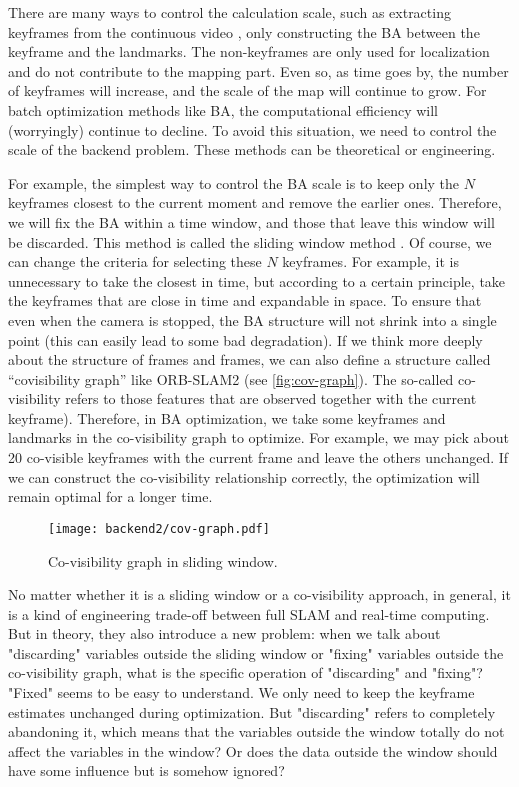There are many ways to control the calculation scale, such as extracting keyframes from the continuous video \cite{Leutenegger2015}, only constructing the BA between the keyframe and the landmarks. The non-keyframes are only used for localization and do not contribute to the mapping part. Even so, as time goes by, the number of keyframes will increase, and the scale of the map will continue to grow. For batch optimization methods like BA, the computational efficiency will (worryingly) continue to decline. To avoid this situation, we need to control the scale of the backend problem. These methods can be theoretical or engineering.

For example, the simplest way to control the BA scale is to keep only the $N$ keyframes closest to the current moment and remove the earlier ones. Therefore, we will fix the BA within a time window, and those that leave this window will be discarded. This method is called the sliding window method \cite{Sibley2008}. Of course, we can change the criteria for selecting these $N$ keyframes. For example, it is unnecessary to take the closest in time, but according to a certain principle, take the keyframes that are close in time and expandable in space. To ensure that even when the camera is stopped, the BA structure will not shrink into a single point (this can easily lead to some bad degradation). If we think more deeply about the structure of frames and frames, we can also define a structure called ``covisibility graph'' like ORB-SLAM2 \cite{Mur-Artal2015} (see \autoref{fig:cov-graph}). The so-called co-visibility refers to those features that are observed together with the current keyframe). Therefore, in BA optimization, we take some keyframes and landmarks in the co-visibility graph to optimize. For example, we may pick about 20 co-visible keyframes with the current frame and leave the others unchanged. If we can construct the co-visibility relationship correctly, the optimization will remain optimal for a longer time.

\begin{figure}[!ht]
	\centering
	\texttt{[image: backend2/cov-graph.pdf]}
	\caption{Co-visibility graph in sliding window. }
	\label{fig:cov-graph}
\end{figure}

No matter whether it is a sliding window or a co-visibility approach, in general, it is a kind of engineering trade-off between full SLAM and real-time computing. But in theory, they also introduce a new problem: when we talk about "discarding" variables outside the sliding window or "fixing" variables outside the co-visibility graph, what is the specific operation of "discarding" and "fixing"? "Fixed" seems to be easy to understand. We only need to keep the keyframe estimates unchanged during optimization. But "discarding" refers to completely abandoning it, which means that the variables outside the window totally do not affect the variables in the window?  Or does the data outside the window should have some influence but is somehow ignored? 

